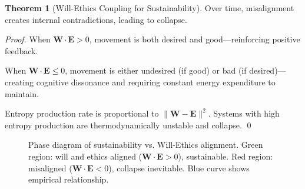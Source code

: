 \documentclass[11pt,a4paper]{article}
\theoremstyle{definition}
\newtheorem{theorem}{Theorem}[section]
\theoremstyle{remark}
\newcommand{\EE}{\mathbf{E}}
\newcommand{\WW}{\mathbf{W}}
\begin{document}
\begin{enumerate}
\begin{theorem}[Will-Ethics Coupling for Sustainability]
Over time, misalignment creates internal contradictions, leading to collapse.
\end{theorem}

\begin{proof}
When \(\WW \cdot \EE > 0\), movement is both desired and good—reinforcing positive feedback.

When \(\WW \cdot \EE \leq 0\), movement is either undesired (if good) or bad (if desired)—creating cognitive dissonance and requiring constant energy expenditure to maintain.

Entropy production rate is proportional to \(\|\WW - \EE\|^2\). Systems with high entropy production are thermodynamically unstable and collapse. \qed
\end{proof}

\begin{figure}[H]
\centering
{}
\caption{Phase diagram of sustainability vs. Will-Ethics alignment. Green region: will and ethics aligned (\(\WW \cdot \EE > 0\)), sustainable. Red region: misaligned (\(\WW \cdot \EE < 0\)), collapse inevitable. Blue curve shows empirical relationship.}
\label{fig:will_ethics_phase}
\end{figure}


\end{enumerate}
\end{document}
